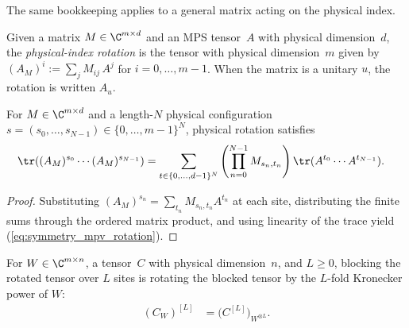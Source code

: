 The same bookkeeping applies to a general matrix acting on the physical index.

\begin{definition}%
    \label{def:rotate_physical}
    \leanok
    Given a matrix $M \in \C^{m\times d}$ and an MPS tensor~$A$ with
    physical dimension~$d$, the \emph{physical-index rotation} is the tensor
    with physical dimension~$m$ given by
    $(A_M)^i := \sum_j M_{ij}\, A^j$ for $i=0,\ldots,m-1$.
    When the matrix is a unitary $u$, the rotation is written $A_u$.
\end{definition}

\begin{lemma}
    \label{lem:mpv_rotate_physical}
    \leanok
    For $M\in\C^{m\times d}$ and a length-$N$ physical configuration
    $s=(s_0,\ldots,s_{N-1})\in\{0,\ldots,m-1\}^N$, physical rotation
    satisfies
    \begin{align}
        \tr((A_M)^{s_0}\cdots(A_M)^{s_{N-1}})
         & =
        \sum_{t\in\{0,\ldots,d-1\}^N}
        \left(\prod_{n=0}^{N-1}M_{s_n,t_n}\right)
        \tr(A^{t_0}\cdots A^{t_{N-1}}).
        \label{eq:symmetry_mpv_rotation}
    \end{align}
\end{lemma}

\begin{proof}\leanok
    Substituting $(A_M)^{s_n}=\sum_{t_n}M_{s_n,t_n}A^{t_n}$ at each site,
    distributing the finite sums through the ordered matrix product, and using
    linearity of the trace yield (\ref{eq:symmetry_mpv_rotation}).
\end{proof}

\begin{lemma}
    \label{thm:block_tensor_rotate_physical}
    \leanok
    For $W\in\C^{m\times n}$, a tensor~$C$ with physical dimension~$n$, and
    $L\ge0$, blocking the rotated tensor over $L$ sites is rotating the
    blocked tensor by the $L$-fold Kronecker power of $W$:
    \begin{align}
        (C_W)^{[L]} & =\bigl(C^{[L]}\bigr)_{W^{\otimes L}}.
        \label{eq:app_block_tensor_rotate_physical}
    \end{align}
\end{lemma}

